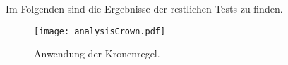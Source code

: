 Im Folgenden sind die Ergebnisse der restlichen Tests zu finden.

\begin{figure}[htb]
\centering
  	{\texttt{[image: analysisCrown.pdf]}}
	\caption{Anwendung der Kronenregel.\label{fig:crown}}
\centering
\end{figure}





